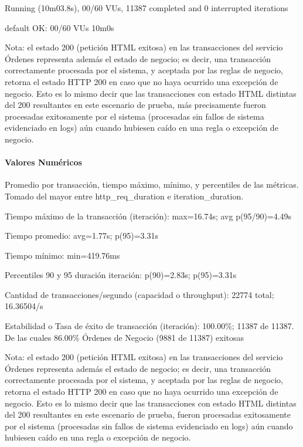 \documentclass[
  paper=a4,
  ,captions=tableheading
]{scrartcl}
\renewenvironment{quote}{\begin{customblockquote}\list{}{\rightmargin=0em\leftmargin=0em}%
\item\relax\color{blockquote-text}\ignorespaces}{\unskip\unskip\endlist\end{customblockquote}}
\begin{document}
\begin{quote}
Running (10m03.8s), 00/60 VUs, 11387 completed and 0 interrupted
iterations

default OK: 00/60 VUs 10m0s
\end{quote}

Nota: el estado 200 (petición HTML exitosa) en las transacciones del
servicio Órdenes representa además el estado de negocio; es decir, una
transacción correctamente procesada por el sistema, y aceptada por las
reglas de negocio, retorna el estado HTTP 200 en caso que no haya
ocurrido una excepción de negocio. Esto es lo mismo decir que las
transacciones con estado HTML distintas del 200 resultantes en este
escenario de prueba, más precisamente fueron procesadas exitosamente por
el sistema (procesadas sin fallos de sistema evidenciado en logs) aún
cuando hubiesen caído en una regla o excepción de negocio.

\paragraph{Valores Numéricos}\label{sec:valores-numuxe9ricos-2}

Promedio por transacción, tiempo máximo, mínimo, y percentiles de las
métricas. Tomado del mayor entre http\_req\_duration e
iteration\_duration.

\begin{quote}
Tiempo máximo de la transacción (iteración): max=16.74s; avg
p(95/90)=4.49s

Tiempo promedio: avg=1.77s; p(95)=3.31s

Tiempo mínimo: min=419.76ms

Percentiles 90 y 95 duración iteración: p(90)=2.83s; p(95)=3.31s

Cantidad de transacciones/segundo (capacidad o throughput): 22774 total;
16.36504/s

Estabilidad o Tasa de éxito de transacción (iteración): 100.00\%; 11387
de 11387. De las cuales 86.00\% Órdenes de Negocio (9881 de 11387)
exitosas
\end{quote}

Nota: el estado 200 (petición HTML exitosa) en las transacciones del
servicio Órdenes representa además el estado de negocio; es decir, una
transacción correctamente procesada por el sistema, y aceptada por las
reglas de negocio, retorna el estado HTTP 200 en caso que no haya
ocurrido una excepción de negocio. Esto es lo mismo decir que las
transacciones con estado HTML distintas del 200 resultantes en este
escenario de prueba, fueron procesadas exitosamente por el sistema
(procesadas sin fallos de sistema evidenciado en logs) aún cuando
hubiesen caído en una regla o excepción de negocio.
\end{document}
